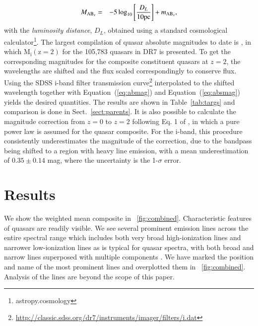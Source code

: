 \documentclass{aa}    %
\newcommand{\figref}[1]{\ref{fig:#1}}
\newcommand{\Fig}[1]{\figurename~\figref{#1}}
\newcommand{\fig}[1]{\Fig{#1}}
\newcommand{\Tab}[1]{Table~\ref{tab:#1}}
\newcommand{\tab}[1]{\Tab{#1}}
\newcommand{\Eq}[1]{Equation~(\ref{eq:#1})}
\newcommand{\eq}[1]{\Eq{#1}}
\newcommand{\eqlabel}[1]{\label{eq:#1}}
\newcommand{\sectionname}{Sect.}
\newcommand{\Sect}[1]{\sectionname~\ref{sect:#1}}
\newcommand{\sect}[1]{\Sect{#1}}
\newcommand{\sectlabel}[1]{\label{sect:#1}}
\begin{document}
\begin{eqnarray}\eqlabel{absmag}
M_{\textmd{AB}_x} &=& -5 \log_{10} \left[  \frac{D_L }{10 \mathrm{pc}}   \right] + m_{\textmd{AB}_x} ,
\end{eqnarray}
with the \textit{luminosity distance}, $D_L$,  obtained using a standard cosmological calculator\footnote{astropy.cosmology}.
 The largest compilation of quasar absolute magnitudes to date is \cite{Shen2011}, in which $\mathrm{M_i (z=2)}$ for the 105,783 quasars in DR7 is presented. To get the corresponding magnitudes for the composite constituent quasars at $z = 2$, the wavelengths are shifted and the flux scaled correspondingly to conserve flux. Using the SDSS i-band filter transmission curve\footnote{\url{http://classic.sdss.org/dr7/instruments/imager/filters/i.dat}} interpolated to the shifted wavelength together with \eq{abmag} and \eq{absmag} yields the desired quantities. The results are shown in \tab{targs} and comparison is done in \sect{parents}.
 It is also possible to calculate the magnitude correction from $z = 0$ to $z = 2$ following Eq. 1 of \cite{Richards2006a}, in which a pure power law is assumed for the quasar composite. For the i-band, this procedure consistently underestimates the magnitude of the correction, due to the bandpass being shifted to a region with heavy line emission, with a mean underestimation of $0.35 \pm 0.14$ mag, where the uncertainty is the 1-$\sigma$ error.







\section{Results}   \sectlabel{results}


We show the weighted mean composite in \fig{combined}. Characteristic features of quasars are readily visible. We see several prominent emission lines across the entire spectral range which includes both very broad high-ionization lines and narrower low-ionization lines as is typical for quasar spectra, with both broad and narrow lines superposed with multiple components \citep{Baldwin1995}. We have marked the position and name of the most prominent lines and overplotted them in \fig{combined}.  Analysis of the lines are beyond the scope of this paper.
\end{document}
